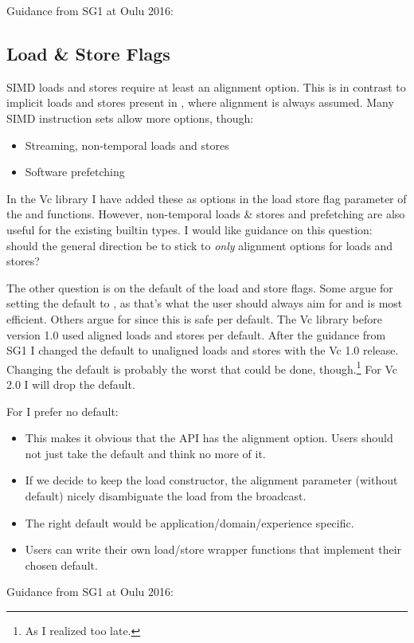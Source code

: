Guidance from SG1 at Oulu 2016:\\

\subsection{Load \& Store Flags}\label{sec:flags}
SIMD loads and stores require at least an alignment option.
This is in contrast to implicit loads and stores present in \CC{}, where alignment is always assumed.
Many SIMD instruction sets allow more options, though:
\begin{itemize}
  \item Streaming, non-temporal loads and stores
  \item Software prefetching
\end{itemize}
In the Vc library I have added these as options in the load store flag parameter of the  and  functions.
However, non-temporal loads \& stores and prefetching are also useful for the existing builtin types.
I would like guidance on this question: should the general direction be to stick to \emph{only} alignment options for \datapar loads and stores?

The other question is on the default of the load and store flags.
Some argue for setting the default to , as that's what the user should always aim for and is most efficient.
Others argue for  since this is safe per default.
The Vc library before version 1.0 used aligned loads and stores per default.
After the guidance from SG1 I changed the default to unaligned loads and stores with the Vc 1.0 release.
Changing the default is probably the worst that could be done, though.\footnote{As I realized too late.}
For Vc 2.0 I will drop the default.

For \datapar I prefer no default:
\begin{itemize}
  \item This makes it obvious that the API has the alignment option.
    Users should not just take the default and think no more of it.
  \item If we decide to keep the load constructor, the alignment parameter (without default) nicely disambiguate the load from the broadcast.
  \item The right default would be application/domain/experience specific.
  \item Users can write their own load/store wrapper functions that implement their chosen default.
\end{itemize}

Guidance from SG1 at Oulu 2016:\\


